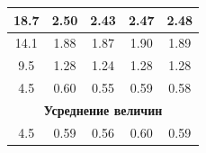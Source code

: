 \documentclass[a4paper,12pt]{report}
\begin{document}
\begin{table}[]
{\begin{tabular}{|c|c|c|c|c|}
18.7                                                                       & 2.50                                                                                   & 2.43                                                                                    & 2.47                                                                                        & 2.48                                                                                        \\ \hline
14.1                                                                       & 1.88                                                                                   & 1.87                                                                                    & 1.90                                                                                        & 1.89                                                                                        \\ \hline
9.5                                                                        & 1.28                                                                                   & 1.24                                                                                    & 1.28                                                                                        & 1.28                                                                                        \\ \hline
4.5                                                                        & 0.60                                                                                   & 0.55                                                                                    & 0.59                                                                                        & 0.58                                                                                        \\ \hline
\multicolumn{5}{|c|}{\textbf{Усреднение величин}}                                                                                                                                                                                                                                                                                                                                                                                                         \\ \hline
4.5                                                                        & 0.59                                                                                   & 0.56                                                                                    & 0.60                                                                                        & 0.59                                                                                        \\ \hline

\end{tabular}}
\end{table}
\end{document}
